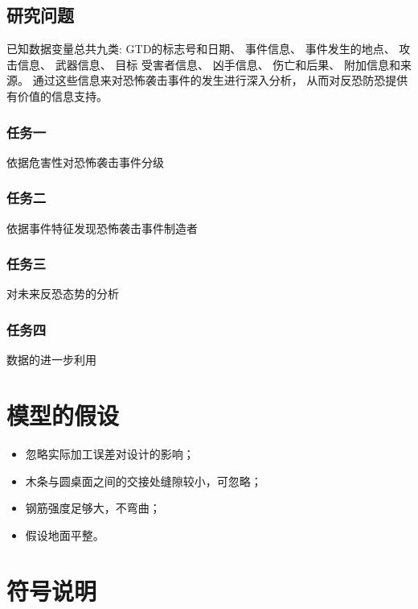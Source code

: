 \documentclass[bwprint]{gmcmthesis}
\begin{document}
\subsection{研究问题}

已知数据变量总共九类:
GTD的标志号和日期、
事件信息、
事件发生的地点、
攻击信息、
武器信息、
目标\/ 受害者信息、
凶手信息、
伤亡和后果、
附加信息和来源。
通过这些信息来对恐怖袭击事件的发生进行深入分析，
从而对反恐防恐提供有价值的信息支持。

\subsubsection{任务一}

依据危害性对恐怖袭击事件分级

\subsubsection{任务二}

依据事件特征发现恐怖袭击事件制造者

\subsubsection{任务三}

对未来反恐态势的分析

\subsubsection{任务四}

数据的进一步利用

\section{模型的假设}

\begin{itemize}
\item 忽略实际加工误差对设计的影响；
\item 木条与圆桌面之间的交接处缝隙较小，可忽略；
\item 钢筋强度足够大，不弯曲；
\item 假设地面平整。
\end{itemize}

\section{符号说明}
\end{document}
